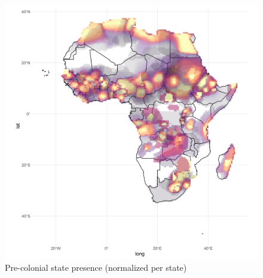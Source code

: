 \begin{figure}[hbpt]
	\centering
	\includegraphics[width=\textwidth]{img/geo_isd_all.png}
	\caption{Pre-colonial state presence (normalized per state)}
	\label{spnorm}
\end{figure}

